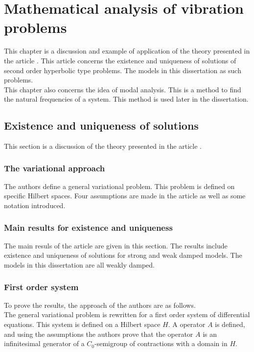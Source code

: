 \documentclass[../main.tex]{subfiles}
\begin{document}
\section{Mathematical analysis of vibration problems}

This chapter is a discussion and example of application of the theory presented in the article \cite{VV02}. This article concerns the existence and uniqueness of solutions of second order hyperbolic type problems. The models in this dissertation as such problems.\\

This chapter also concerns the idea of modal analysis. This is a method to find the natural frequencies of a system. This method is used later in the dissertation.

\subsection{Existence and uniqueness of solutions}
This section is a discussion of the theory presented in the article \cite{VV02}.

\subsubsection{The variational approach}

The authors define a general variational problem. This problem is defined on specific Hilbert spaces. Four assumptions are made in the article as well as some notation introduced.

\subsubsection{Main results for existence and uniqueness}
The main resuls of the article are given in this section. The results include existence and uniqueness of solutions for strong and weak damped models. The models in this dissertation are all weakly damped. 

\subsubsection{First order system}
To prove the results, the approach of the authors are as follows.\\

The general variational problem is rewritten for a first order system of differential equations. This system is defined on a Hilbert space $H$. A operator $A$ is defined, and using the assumptions the authors prove that the operator $A$ is an infinitesimal generator of a $C_0$-semigroup of contractions with a domain in $H$.\\
\end{document}
